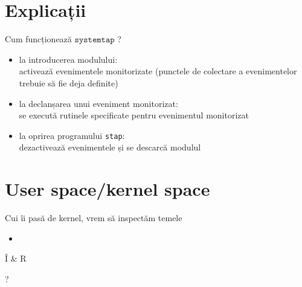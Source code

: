 \documentclass{beamer}
\newcommand{\systemtap}{$\texttt{systemtap}$ }
\begin{document}
    
\section{Explicații}
\begin{frame}{Cum funcționează \systemtap?}
  \begin{itemize}
  \item la introducerea modulului: \\ \small activează evenimentele
    monitorizate (punctele de colectare a evenimentelor trebuie să fie
    deja definite)
  \item la declanșarea unui eveniment monitorizat: \\ \small se
    execută rutinele specificate pentru evenimentul monitorizat
  \item la oprirea programului \texttt{stap}: \\ \small dezactivează
    evenimentele și se descarcă modulul
  \end {itemize}
\end{frame}

\section{User space/kernel space}

\begin{frame}{Cui îi pasă de kernel, vrem să inspectăm temele}
  \begin{itemize}
    \item 
  \end{itemize}
\end{frame}


\begin{frame}{Î \& R}
  \begin{centering}
    \Huge ?    \par
  \end{centering}
\end{frame}
\end{document}
